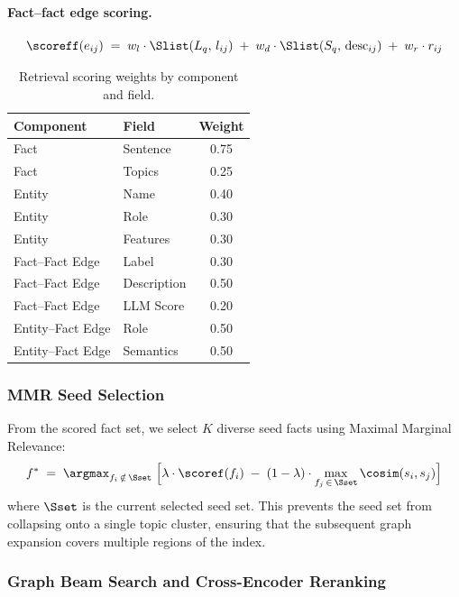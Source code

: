 \documentclass[runningheads]{llncs}
\begin{document}
\paragraph{Fact--fact edge scoring.}
\[
  \scoreff(e_{ij}) \;=\;
  w_l \cdot \Slist(L_q,\, l_{ij}) \;+\;
  w_d \cdot \Slist(S_q,\, \mathrm{desc}_{ij}) \;+\;
  w_r \cdot r_{ij}
\]
 
\begin{table}[h]
\centering
\caption{Retrieval scoring weights by component and field.}
\label{tab:weights}
\begin{tabular}{llc}
\toprule
\textbf{Component} & \textbf{Field} & \textbf{Weight} \\
\midrule
Fact              & Sentence       & 0.75 \\
Fact              & Topics         & 0.25 \\
\midrule
Entity            & Name           & 0.40 \\
Entity            & Role           & 0.30 \\
Entity            & Features       & 0.30 \\
\midrule
Fact--Fact Edge   & Label          & 0.30 \\
Fact--Fact Edge   & Description    & 0.50 \\
Fact--Fact Edge   & LLM Score      & 0.20 \\
\midrule
Entity--Fact Edge & Role           & 0.50 \\
Entity--Fact Edge & Semantics      & 0.50 \\
\bottomrule
\end{tabular}
\end{table}
 
\subsubsection*{MMR Seed Selection}
 
From the scored fact set, we select $K$ diverse seed facts using Maximal
Marginal Relevance:
\[
  f^* \;=\; \argmax_{f_i \,\notin\, \Sset}\;
  \Bigl[
    \lambda \cdot \scoref(f_i)
    \;-\;
    (1 - \lambda) \cdot \max_{f_j \,\in\, \Sset} \cosim(s_i, s_j)
  \Bigr]
\]
where $\Sset$ is the current selected seed set. This prevents the seed set from
collapsing onto a single topic cluster, ensuring that the subsequent graph
expansion covers multiple regions of the index.
 
\subsubsection*{Graph Beam Search and Cross-Encoder Reranking}
 
\end{document}
